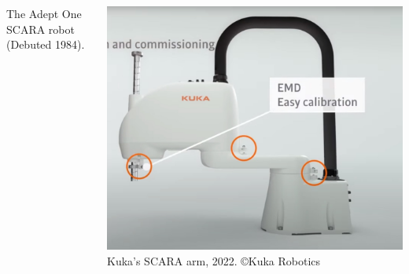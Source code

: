 \begin{frame}
\begin{columns}[t]
\begin{column}{5cm}
\begin{minipage}[b]{.5\textwidth}
\footnotesize The Adept One SCARA robot (Debuted 1984). 
\end{minipage}
\end{column}
%
\begin{column}{5cm}
\begin{minipage}[b]{.5\textwidth}
\includegraphics[width=1.5\textwidth, height=1.5\textwidth]{figures/Scara.jpg} \\
\footnotesize{Kuka's SCARA arm, 2022. \copyright Kuka Robotics} %
\end{minipage}
%
\end{column}
\end{columns}
\end{frame}


